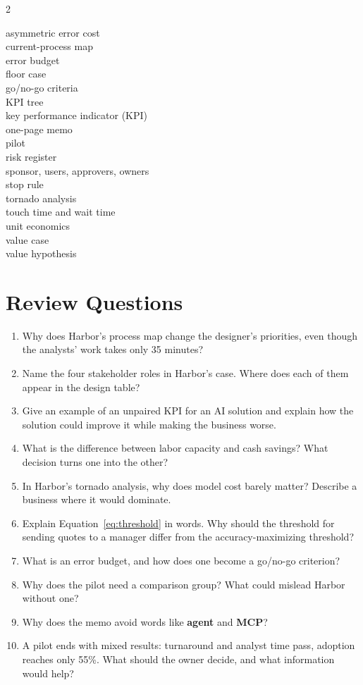 \begin{multicols}{2}
\raggedright\small
asymmetric error cost \\
current-process map \\
error budget \\
floor case \\
go/no-go criteria \\
KPI tree \\
key performance indicator (KPI) \\
one-page memo \\
pilot \\
risk register \\
sponsor, users, approvers, owners \\
stop rule \\
tornado analysis \\
touch time and wait time \\
unit economics \\
value case \\
value hypothesis
\end{multicols}

\section*{Review Questions}

\begin{enumerate}[itemsep=2pt]
  \item Why does Harbor's process map change the designer's priorities, even though the analysts' work takes only 35 minutes?
  \item Name the four stakeholder roles in Harbor's case. Where does each of them appear in the design table?
  \item Give an example of an unpaired KPI for an AI solution and explain how the solution could improve it while making the business worse.
  \item What is the difference between labor capacity and cash savings? What decision turns one into the other?
  \item In Harbor's tornado analysis, why does model cost barely matter? Describe a business where it would dominate.
  \item Explain Equation~\eqref{eq:threshold} in words. Why should the threshold for sending quotes to a manager differ from the accuracy-maximizing threshold?
  \item What is an error budget, and how does one become a go/no-go criterion?
  \item Why does the pilot need a comparison group? What could mislead Harbor without one?
  \item Why does the memo avoid words like \textbf{agent} and \textbf{MCP}?
  \item A pilot ends with mixed results: turnaround and analyst time pass, adoption reaches only 55\%. What should the owner decide, and what information would help?
\end{enumerate}

